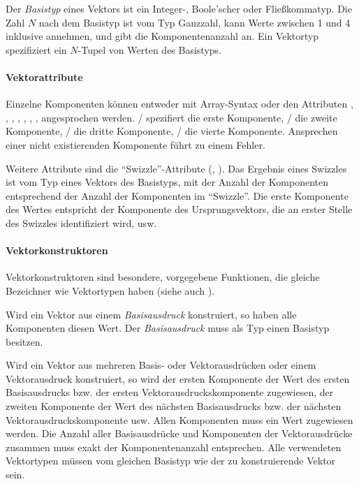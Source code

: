

Der \emph{Basistyp} eines Vektors ist ein Integer-, Boole'scher oder Fließkommatyp.
Die Zahl $N$ nach dem Basistyp ist vom Typ
Ganzzahl, kann Werte zwischen 1 und 4 inklusive annehmen, und gibt die Komponentenanzahl an.
Ein Vektortyp spezifiziert ein $N$-Tupel von Werten
des Basistyps.



\paragraph{Vektorattribute}\label{Vektorattribute}
Einzelne Komponenten können entweder mit Array-Syntax oder den Attributen ,
, , , , , ,  angesprochen
werden. / spezifiert die erste Komponente,
/ die zweite Komponente, / die dritte Komponente,
/ die vierte Komponente. Ansprechen einer nicht existierenden Komponente
führt zu einem Fehler.

Weitere Attribute sind die "`Swizzle"'-Attribute (, ).
Das Ergebnis eines Swizzles ist vom Typ eines Vektors des Basistyps, mit der Anzahl der Komponenten
entsprechend der Anzahl der Komponenten im "`Swizzle"'. Die erste Komponente des Wertes entspricht
der Komponente des Ursprungsvektors, die an erster Stelle des Swizzles identifiziert wird, usw.

\paragraph{Vektorkonstruktoren}\label{Vektorkonstruktoren}

Vektorkonstruktoren sind besondere, vorgegebene Funktionen, die gleiche Bezeichner wie Vektortypen haben
(siehe auch ).

Wird ein Vektor aus einem \emph{Basisausdruck} konstruiert, so haben alle Komponenten diesen Wert.
Der \emph{Basisausdruck} muss als Typ einen Basistyp besitzen.

Wird ein Vektor aus mehreren Basis- oder Vektorausdrücken oder einem Vektorausdruck konstruiert,
so wird der ersten Komponente der Wert des ersten Basisausdrucks bzw. der ersten Vektorausdruckskomponente zugewiesen,
der zweiten Komponente der Wert des nächsten Basisausdrucks bzw. der nächsten Vektorausdruckskomponente usw.
Allen Komponenten muss ein Wert zugewiesen werden. Die Anzahl aller Basisausdrücke und Komponenten der Vektorausdrücke
zusammen muss exakt der Komponentenanzahl entsprechen.
Alle verwendeten Vektortypen müssen vom gleichen Basistyp wie der zu konstruierende Vektor sein.


